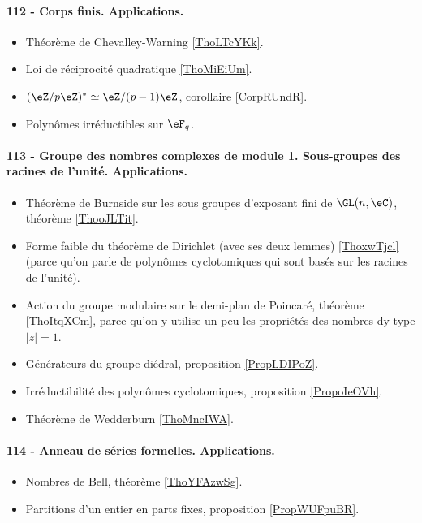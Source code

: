 \paragraph{112 - Corps finis. Applications.}
\begin{itemize}
    \item Théorème de Chevalley-Warning \ref{ThoLTcYKk}.
    \item Loi de réciprocité quadratique \ref{ThoMiEiUm}.
    \item \( (\eZ/p\eZ)^*\simeq \eZ/(p-1)\eZ\), corollaire \ref{CorpRUndR}.
    \item Polynômes irréductibles sur \( \eF_q\).
\end{itemize}

\paragraph{113 - Groupe des nombres complexes de module 1. Sous-groupes des racines de l’unité. Applications.}
\begin{itemize}
    \item Théorème de Burnside sur les sous groupes d'exposant fini de \( \GL(n,\eC)\), théorème \ref{ThooJLTit}.
    \item Forme faible du théorème de Dirichlet (avec ses deux lemmes) \ref{ThoxwTjcl} (parce qu'on parle de polynômes cyclotomiques qui sont basés sur les racines de l'unité).
    \item Action du groupe modulaire sur le demi-plan de Poincaré, théorème \ref{ThoItqXCm}, parce qu'on y utilise un peu les propriétés des nombres dy type \( | z |=1\).
    \item Générateurs du groupe diédral, proposition \ref{PropLDIPoZ}.
    \item Irréductibilité des polynômes cyclotomiques, proposition \ref{PropoIeOVh}.
    \item Théorème de Wedderburn \ref{ThoMncIWA}.
\end{itemize}

\paragraph{114 - Anneau de séries formelles. Applications.}
\begin{itemize}
    \item Nombres de Bell, théorème \ref{ThoYFAzwSg}.
    \item Partitions d'un entier en parts fixes, proposition \ref{PropWUFpuBR}.
\end{itemize}

